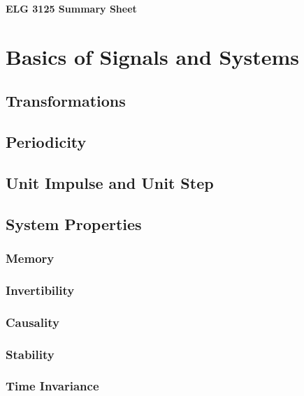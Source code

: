 \documentclass[12pt,letterpaper]{article} \usepackage{amsmath} \usepackage{graphicx} \usepackage[margin=1in]{geometry} \usepackage{longtable}  \usepackage{amssymb}
\begin{document}
	
	\begin{center}
		\Large\textbf{ELG 3125 Summary Sheet} \\
		\vspace{0.5em}
	\end{center}	

	\section{Basics of Signals and Systems}
	
	\subsection{Transformations}
	
	\subsection{Periodicity}
	
	\subsection{Unit Impulse and Unit Step}
	
	\subsection{System Properties}
	
	\subsubsection{Memory}
	
	\subsubsection{Invertibility}
	
	\subsubsection{Causality}
	
	\subsubsection{Stability}
	
	\subsubsection{Time Invariance}
	
\end{document}
